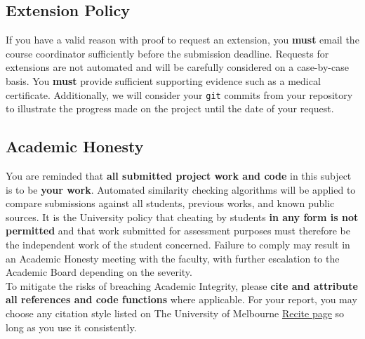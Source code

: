 \documentclass[12pt]{article}
\begin{document}
\subsection*{Extension Policy}
If you have a valid reason with proof to request an extension, you \textbf{must} email the course coordinator sufficiently before the submission deadline. Requests for extensions are not automated and will be carefully considered on a case-by-case basis. You \textbf{must} provide sufficient supporting evidence such as a medical certificate. Additionally, we will consider your \texttt{git} commits from your repository to illustrate the progress made on the project until the date of your request.

\subsection*{Academic Honesty}
You are reminded that \textbf{all submitted project work and code} in this subject is to be \textbf{your work}. Automated similarity checking algorithms will be applied to compare submissions against all students, previous works, and known public sources. It is the University policy that cheating by students \textbf{in any form is not permitted} and that work submitted for assessment purposes must therefore be the independent work of the student concerned. Failure to comply may result in an Academic Honesty meeting with the faculty, with further escalation to the Academic Board depending on the severity. \\

To mitigate the risks of breaching Academic Integrity, please \textbf{cite and attribute all references and code functions} where applicable. For your report, you may choose any citation style listed on The University of Melbourne  \href{https://library.unimelb.edu.au/recite}{Recite page} so long as you use it consistently. 

\clearpage
\end{document}
